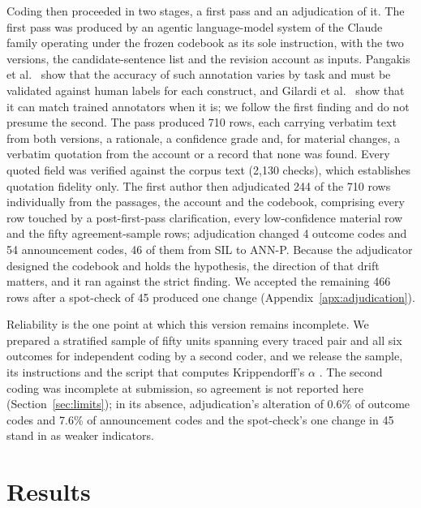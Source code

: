 \documentclass{article}
\begin{document}
Coding then proceeded in two stages, a first pass and an adjudication of it. The first pass was produced by an agentic language-model system of the Claude family operating under the frozen codebook as its sole instruction, with the two versions, the candidate-sentence list and the revision account as inputs. Pangakis et al.\ \citep{pangakis2023automated} show that the accuracy of such annotation varies by task and must be validated against human labels for each construct, and Gilardi et al.\ \citep{gilardi2023chatgpt} show that it can match trained annotators when it is; we follow the first finding and do not presume the second. The pass produced 710 rows, each carrying verbatim text from both versions, a rationale, a confidence grade and, for material changes, a verbatim quotation from the account or a record that none was found. Every quoted field was verified against the corpus text (2{,}130 checks), which establishes quotation fidelity only. The first author then adjudicated 244 of the 710 rows individually from the passages, the account and the codebook, comprising every row touched by a post-first-pass clarification, every low-confidence material row and the fifty agreement-sample rows; adjudication changed 4 outcome codes and 54 announcement codes, 46 of them from SIL to ANN-P. Because the adjudicator designed the codebook and holds the hypothesis, the direction of that drift matters, and it ran against the strict finding. We accepted the remaining 466 rows after a spot-check of 45 produced one change (Appendix~\ref{apx:adjudication}).

Reliability is the one point at which this version remains incomplete. We prepared a stratified sample of fifty units spanning every traced pair and all six outcomes for independent coding by a second coder, and we release the sample, its instructions and the script that computes Krippendorff's $\alpha$ \citep{krippendorff2019content,hayes2007answering}. The second coding was incomplete at submission, so agreement is not reported here (Section~\ref{sec:limits}); in its absence, adjudication's alteration of 0.6\% of outcome codes and 7.6\% of announcement codes and the spot-check's one change in 45 stand in as weaker indicators.

\section{Results}
\label{sec:results}
\end{document}
